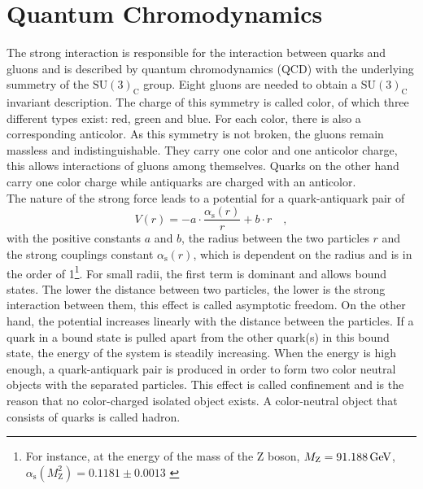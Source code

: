 \section{Quantum Chromodynamics} \label{sec:ch_1_QCD}
The strong interaction is responsible for the interaction between quarks and gluons and is described by quantum chromodynamics (QCD) with the underlying summetry of the $\textrm{SU}(3)_\textrm{C}$ group. Eight gluons are needed to obtain a $\textrm{SU}(3)_\textrm{C}$ invariant description. The charge of this symmetry is called color, of which three different types exist: red, green and blue. For each color, there is also a corresponding anticolor. As this symmetry is not broken, the gluons remain massless and indistinguishable. They carry one color and one anticolor charge, this allows interactions of gluons among themselves. Quarks on the other hand carry one color charge while antiquarks are charged with an anticolor.\\

The nature of the strong force leads to a potential for a quark-antiquark pair of
\begin{equation} \label{eq:ch_1_qcdPotential}
V(r) = - a \cdot \frac{\alpha_\textrm{s}(r)}{r} + b \cdot r \quad ,
\end{equation}
with the positive constants $a$ and $b$, the radius between the two particles $r$ and the strong couplings constant $\alpha_\textrm{s}(r)$, which is dependent on the radius and is in the order of 1\footnote{For instance, at the energy of the mass of the Z boson, $M_\textrm{Z} = 91.188\, \mathrm{GeV}$, $\alpha_\textrm{s}(M_\textrm{Z}^2)=0.1181\pm0.0013$ \cite{pdg}}. For small radii, the first term is dominant and allows bound states. The lower the distance between two particles, the lower is the strong interaction between them, this effect is called asymptotic freedom. On the other hand, the potential increases linearly with the distance between the particles. If a quark in a bound state is pulled apart from the other quark(s) in this bound state, the energy of the system is steadily increasing. When the energy is high enough, a quark-antiquark pair is produced in order to form two color neutral objects with the separated particles. This effect is called confinement and is the reason that no color-charged isolated object exists. A color-neutral object that consists of quarks is called hadron. \\

